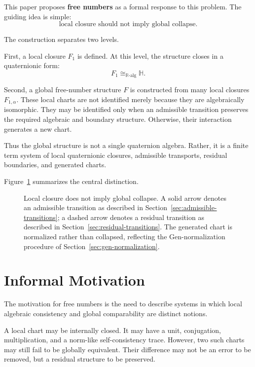 \documentclass[11pt]{article}
\begin{document}
This paper proposes \textbf{free numbers} as a formal response to this problem. The guiding idea is simple:
\[
\text{local closure should not imply global collapse.}
\]

The construction separates two levels.

First, a local closure $F_1$ is defined. At this level, the structure closes in a quaternionic form:
\[
F_1 \cong_{\mathbb{R}\text{-alg}} \mathbb{H}.
\]

Second, a global free-number structure $F$ is constructed from many local closures $F_{1,\alpha}$. These local charts are not identified merely because they are algebraically isomorphic. They may be identified only when an admissible transition preserves the required algebraic and boundary structure. Otherwise, their interaction generates a new chart.

Thus the global structure is not a single quaternion algebra. Rather, it is a finite term system of local quaternionic closures, admissible transports, residual boundaries, and generated charts.

Figure~\ref{fig:local-global-collapse} summarizes the central distinction.

\begin{figure}[t]
\centering

\caption{Local closure does not imply global collapse. A solid arrow denotes an admissible transition as described in Section~\ref{sec:admissible-transitions}; a dashed arrow denotes a residual transition as described in Section~\ref{sec:residual-transitions}. The generated chart is normalized rather than collapsed, reflecting the Gen-normalization procedure of Section~\ref{sec:gen-normalization}.}
\label{fig:local-global-collapse}
\end{figure}

\section{Informal Motivation}

The motivation for free numbers is the need to describe systems in which local algebraic consistency and global comparability are distinct notions.

A local chart may be internally closed. It may have a unit, conjugation, multiplication, and a norm-like self-consistency trace. However, two such charts may still fail to be globally equivalent. Their difference may not be an error to be removed, but a residual structure to be preserved.
\end{document}
